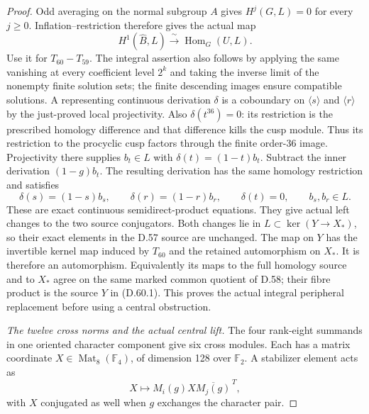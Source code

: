 \begin{proof}
Odd averaging on the normal
subgroup \(A\) gives
\(H^j(G,L)=0\) for every
\(j\geq0\). Inflation--restriction
therefore gives the actual map
\[
 H^1(\widehat B,L)
   \xrightarrow{\ \sim\ }
                       \operatorname{Hom}_G(U,L).
 \tag{D.60.19}
\]
Use it for \(T_{60}-T_{59}\).
The integral assertion also follows
by applying the same vanishing at
every coefficient level \(2^k\)
and taking the inverse limit of
the nonempty finite solution sets;
the finite descending images ensure
compatible solutions.
A representing continuous derivation
\(\delta\) is a coboundary
on \(\langle s\rangle\)
and \(\langle r\rangle\)
by the just-proved local
projectivity. Also
\(\delta(t^{36})=0\): its
restriction is the prescribed
homology difference and that
difference kills the cusp module.
Thus its restriction to the
procyclic cusp factors through
the finite order-36 image.
Projectivity there supplies
\(b_t\in L\) with
\(\delta(t)=(1-t)b_t\).
Subtract the inner derivation
\((1-g)b_t\). The resulting
derivation has the same homology
restriction and satisfies
\[
 \delta(s)=(1-s)b_s,
 \qquad\delta(r)=(1-r)b_r,
 \qquad\delta(t)=0,
 \qquad b_s,b_r\in L.
 \tag{D.60.20}
\]
These are exact continuous
semidirect-product equations.
They give actual left changes
to the two source conjugators.
Both changes lie in
\(L\subset\ker(Y\to X_*)\),
so their exact elements in the
D.57 source are unchanged.
The map on \(Y\) has the
invertible kernel map induced
by \(T_{60}\) and the retained
automorphism on \(X_*\).
It is therefore an automorphism.
Equivalently its maps to the
full homology source and to
\(X_*\) agree on the same
marked common quotient of
D.58; their fibre product is
the source \(Y\) in (D.60.1).
This proves the actual integral
peripheral replacement before
using a central obstruction.

\emph{The twelve cross norms and the actual central lift.}
The four rank-eight summands in
one oriented character component
give six cross modules. Each
has a matrix coordinate
\(X\in\operatorname{Mat}_8(\mathbb F_4)\),
of dimension 128 over
\(\mathbb F_2\). A stabilizer
element acts as
\[
 X\longmapsto M_i(g)X\overline{M_j(g)}^{\,T},
 \tag{D.60.21}
\]
with \(X\) conjugated as well
when \(g\) exchanges the
character pair.


\end{proof}
